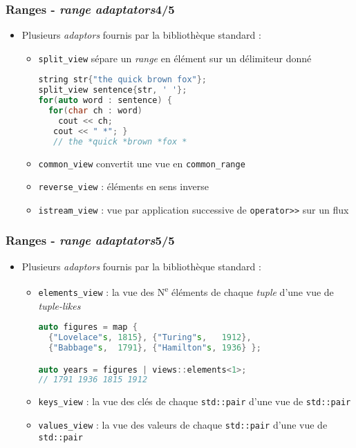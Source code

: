 \documentclass[C++.tex]{subfiles}
\begin{document}
\begin{frame}[fragile]
	\frametitle{Ranges - \textit{range adaptators}\titlehfill{}4/5}
	\begin{itemize}
		\item Plusieurs \textit{adaptors} fournis par la bibliothèque standard :
		\begin{itemize}
			\item \lstinline|split_view| sépare un \textit{range} en élément sur un délimiteur donné
			
			\begin{lstlisting}[language=C++]
string str{"the quick brown fox"};
split_view sentence{str, ' '};
for(auto word : sentence) {
  for(char ch : word)
    cout << ch;
   cout << " *"; }
   // the *quick *brown *fox *\end{lstlisting}
			
			\item \lstinline|common_view| convertit une vue en \lstinline|common_range|
			\item \lstinline|reverse_view| : éléments en sens inverse
			\item \lstinline|istream_view| : vue par application successive de \lstinline|operator>>| sur un flux
		\end{itemize}
	\end{itemize}
\end{frame}

\begin{frame}[fragile]
	\frametitle{Ranges - \textit{range adaptators}\titlehfill{}5/5}
	\begin{itemize}
		\item Plusieurs \textit{adaptors} fournis par la bibliothèque standard :
		\begin{itemize}
			\item \lstinline|elements_view| : la vue des N\textsuperscript{e} éléments de chaque \textit{tuple} d'une vue de \textit{tuple-likes}

			\begin{lstlisting}[language=C++]
auto figures = map {
  {"Lovelace"s, 1815}, {"Turing"s,   1912},
  {"Babbage"s,  1791}, {"Hamilton"s, 1936} };

auto years = figures | views::elements<1>;
// 1791 1936 1815 1912\end{lstlisting}

			\item \lstinline|keys_view| : la vue des clés de chaque \lstinline|std::pair| d'une vue de \lstinline|std::pair|
			\item \lstinline|values_view| : la vue des valeurs de chaque \lstinline|std::pair| d'une vue de \lstinline|std::pair|
		\end{itemize}
	\end{itemize}
\end{frame}
\end{document}
